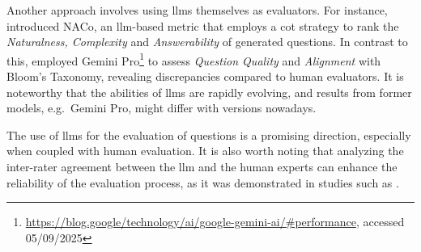  Another approach involves using \acp{llm} themselves as evaluators. For instance, \cite{nguyen_reference-based_2024} introduced NACo, an \ac{llm}-based metric that employs a \ac{cot} strategy to rank the \textit{Naturalness, Complexity} and \textit{Answerability} of generated questions. In contrast to this, \cite{scaria_how_2024} employed Gemini Pro\footnote{\url{https://blog.google/technology/ai/google-gemini-ai/\#performance}, accessed 05/09/2025} to assess \textit{Question Quality} and \textit{Alignment} with Bloom's Taxonomy, revealing discrepancies compared to human evaluators. It is noteworthy that the abilities of \acp{llm} are rapidly evolving, and results from former models, e.g.\ Gemini Pro, might differ with versions nowadays. 

The use of \acp{llm} for the evaluation of questions is a promising direction, especially when coupled with human evaluation. It is also worth noting that analyzing the inter-rater agreement between the \ac{llm} and the human experts can enhance the reliability of the evaluation process, as it was demonstrated in studies such as \cite{mi_comparative_2024}.
